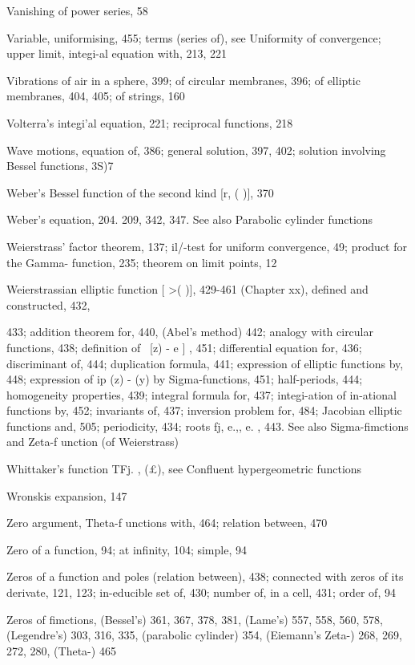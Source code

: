 Vanishing of power series, 58

Variable, uniformising, 455; terms (series of), see Uniformity of convergence; upper limit,
integi-al equation with, 213, 221

Vibrations of air in a sphere, 399; of circular membranes, 396; of elliptic membranes, 404, 405;
of strings, 160

Volterra's integi'al equation, 221; reciprocal functions, 218

Wave motions, equation of, 386; general solution, 397, 402; solution involving Bessel functions,
3S)7

Weber's Bessel function of the second kind [r, ( )], 370

Weber's equation, 204. 209, 342, 347. See also Parabolic cylinder functions

Weierstrass' factor theorem, 137; il/-test for uniform convergence, 49; product for the Gamma-
function, 235; theorem on limit points, 12

Weierstrassian elliptic function [  >( )], 429-461 (Chapter xx), defined and constructed, 432,

433; addition theorem for, 440, (Abel's method) 442; analogy with circular functions,
438; definition of \   [z) - e ] , 451; differential equation for, 436; discriminant of, 444;
duplication formula, 441; expression of elliptic functions by, 448; expression of ip (z) -   (y)
by Sigma-functions, 451; half-periods, 444; homogeneity properties, 439; integral formula
for, 437; integi-ation of in-ational functions by, 452; invariants of, 437; inversion problem
for, 484; Jacobian elliptic functions and, 505; periodicity, 434; roots fj, e.,, e. , 443. See
also Sigma-fimctions and Zeta-f unction (of Weierstrass)

Whittaker's function TFj. , (£), see Confluent hypergeometric functions

Wronskis expansion, 147

Zero argument, Theta-f unctions with, 464; relation between, 470

Zero of a function, 94; at infinity, 104; simple, 94

Zeros of a function and poles (relation between), 438; connected with zeros of its derivate, 121,
123; in-educible set of, 430; number of, in a cell, 431; order of, 94

Zeros of fimctions, (Bessel's) 361, 367, 378, 381, (Lame's) 557, 558, 560, 578, (Legendre's) 303,
316, 335, (parabolic cylinder) 354, (Eiemann's Zeta-) 268, 269, 272, 280, (Theta-) 465

